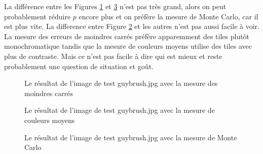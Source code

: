 \documentclass[a4paper]{article}
\begin{document}
La diff\'erence entre les Figures \ref{fig:mse} et \ref{fig:mcmse} n'est pas tr\`es grand, alors on  peut probablement r\'eduire $p$ encore plus et on pr\'ef\`ere la mesure de Monte Carlo, car il est plus vite.  
La difference entre Figure \ref{fig:mean} et les autres n'est pas aussi facile \`a voir.
La mesure des erreurs de moindres carr\'es pr\'ef\`ere apparemment des tiles plut\^ot monochromatique tandis que la mesure de couleurs moyens utilise des tiles avec plus de contraste.
Mais ce n'est pas facile \`a dire qui est mieux et reste probablement une question de situation et go\^ut. 
\begin{figure}
  \centerline{}
  \caption{Le r\'esultat de l'image de test guybrush.jpg avec la mesure des moindres carr\'es}
  \label{fig:mse}
\end{figure}
\begin{figure}
  \centerline{}
  \caption{Le r\'esultat de l'image de test guybrush.jpg avec la mesure de couleurs moyens}
  \label{fig:mean}
\end{figure}
\begin{figure}
  \centerline{}
  \caption{Le r\'esultat de l'image de test guybrush.jpg avec la mesure de Monte Carlo}
  \label{fig:mcmse}
\end{figure}

%		
\end{document}
